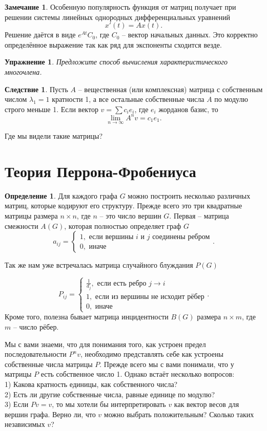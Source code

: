 \documentclass[10pt,a4paper,oneside]{book}
\newtheorem{uprz}{\color{violet!100!black} Упражнение}
\theoremstyle{definition}
\newtheorem*{rem}{\color{green!50!blue}Замечание}
\newtheorem*{defn}{\color{yellow!30!red} Определение}
\newtheorem{cor}{\color{green!45!black}Следствие}
\def\dfn{\begin{defn}}
\def\edfn{\end{defn}}
\def\crl{\begin{cor}}
\def\ecrl{\end{cor}}
\def\rm{\begin{rem}}
\def\erm{\end{rem}}
\def\upr{\begin{uprz}}
\def\eupr{\end{uprz}}
\begin{document}
\rm Особенную популярность функция от матриц получает при решении системы линейных однородных дифференциальных уравнений 
$$x'(t)=Ax(t).$$
Решение даётся в виде $e^{At}C_0$, где $C_0$ -- вектор начальных данных. Это корректно определённое выражение так как ряд для экспоненты сходится везде.
\erm

\upr Предложите  способ вычисления характеристического многочлена.
\eupr


\crl Пусть $A$ -- вещественная (или комплексная) матрица с собственным числом $\lambda_1=1$ кратности 1, а все остальные собственные числа $A$ по модулю строго меньше 1. Если вектор $v= \sum c_i e_i$, где $e_i$ жорданов базис, то $$\lim_{n \to \infty}A^nv= c_1 e_1.$$
\ecrl

Где мы видели такие матрицы?


\section{Теория Перрона-Фробениуса}

\dfn
Для каждого графа $G$ можно построить  несколько  различных матриц, которые кодируют его структуру. Прежде всего это три квадратные матрицы  размера $n\times n$, где $n$ -- это число вершин $G$. 
Первая -- матрица смежности  $A(G)$, которая полностью определяет граф $G$
$$a_{ij}=\begin{cases} 1, \text{ если вершины $i$ и $j$ соединены ребром}\\
0, \text{ иначе }
\end{cases}.$$

Так же нам уже встречалась матрица случайного блуждания  $P(G)$

$$P_{ij}=\begin{cases}
\frac{1}{d_j}, \text{ если есть ребро $j\to i$}\\
1, \text{ если из вершины не исходит рёбер} \\
0, \text{ иначе }
\end{cases}.$$
Кроме того, полезна бывает матрица инцидентности $B(G)$ размера $n\times m$, где $m$ -- число рёбер.
\edfn

Мы с вами знаеми, что для понимания того, как устроен предел последовательности $P^nv$, необходимо представлять себе как устроены собственные числа матрицы $P$. Прежде всего мы с вами понимали, что у матрицы $P$ есть собственное число 1. Однако встаёт несколько вопросов:\\
1) Какова кратность единицы, как собственного числа?\\
2) Есть ли другие собственные числа, равные единице по модулю?\\
3) Если $Pv=v$, то мы хотели бы интерпретировать $v$ как вектор весов для вершин графа. Верно ли, что $v$ можно выбрать положительным? Сколько таких независимых $v$?
\end{document}
